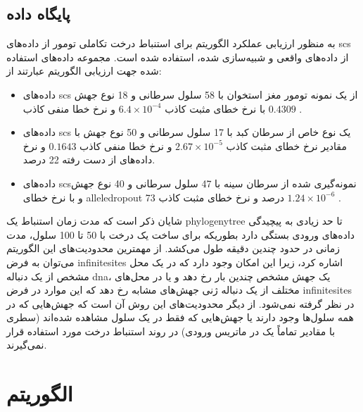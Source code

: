\subsection{پایگاه داده}

به منظور ارزیابی عملکرد الگوریتم  برای استنباط درخت تکاملی تومور از داده‌های \gls{scs} از داده‌های واقعی و شبیه‌سازی شده، استفاده شده است. مجموعه داده‌های استفاده شده جهت ارزیابی الگوریتم عبارتند از: 

\begin{itemize}
	\item      داده‌های  \gls{scs} از یک نمونه تومور مغز استخوان با 58 سلول سرطانی و 18 نوع جهش با نرخ خطای مثبت کاذب $6.4\times10^{-4}$ و نرخ خطا    منفی کاذب $ 0.4309$ . 
	\item     داده‌های  \gls{scs} یک نوع خاص از سرطان کبد با 17 سلول سرطانی و 50 نوع جهش با مقادیر نرخ خطای مثبت کاذب  $2.67 \times 10^{-5}$ و نرخ خطا منفی کاذب $0.1643$ و نرخ داده‌های از دست رفته 22 درصد. 
	\item     داده‌های \gls{scs}نمونه‌گیری شده از سرطان سینه با 47 سلول سرطانی و 40 نوع جهش و با نرخ خطای \gls{alleledropout} 73 درصد و نرخ خطای مثبت کاذب $1.24 \times 10^{-6}$ . 
\end{itemize}


شایان ذکر است که مدت زمان استنباط یک \gls{phylogenytree} تا حد زیادی به پیچیدگی داده‌های ورودی بستگی دارد بطوریکه برای ساخت یک درخت با 50 تا 100 سلول، مدت زمانی در حدود چندین دقیقه طول می‌کشد. از مهمترین محدودیت‌های این الگوریتم می‌توان به فرض \gls{infinitesites} اشاره کرد، زیرا این امکان وجود دارد که در یک محل مشخص از یک دنباله \gls{dna}، یک جهش مشخص چندین بار رخ دهد و یا در محل‌های مختلف از یک دنباله ژنی جهش‌های مشابه رخ دهد که این موارد در فرض \gls{infinitesites} در نظر گرفته نمی‌شود. از دیگر محدودیت‌های این روش آن است که جهش‌هایی که در همه سلول‌ها وجود دارند یا جهش‌هایی که فقط در یک سلول مشاهده شده‌اند (سطری با مقادیر تماماً یک در ماتریس ورودی) در روند استنباط درخت مورد استفاده قرار نمی‌گیرند. 


\section{الگوریتم  \cite{ross2016onconem}}


